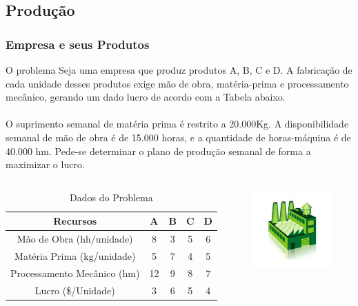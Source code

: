 \documentclass{beamer}
\begin{document}
\subsection{Produção}
\begin{frame}
	\frametitle{Empresa e seus Produtos}
	\begin{block}{O problema}
		\scriptsize
		Seja uma empresa que produz produtos A, B, C e D. A fabricação de cada unidade desses produtos exige mão de obra, matéria-prima e processamento mecânico, gerando um dado lucro de acordo com a Tabela abaixo.
		\\~\\
		O suprimento semanal de matéria prima é restrito a 20.000Kg. A disponibilidade semanal de mão de obra é de 15.000 horas, e a quantidade de horas-máquina é de 40.000 hm. Pede-se determinar o plano de produção semanal de forma a maximizar o lucro. 
	\end{block}
	\begin{columns}
		\begin{column}{0.7\textwidth}
			\begin{table}
				\scriptsize
				\caption{Dados do Problema}
				\begin{tabular}{| c | c | c | c | c |}
					\hline
					\textbf{Recursos} 			& \textbf{A} & \textbf{B} & \textbf{C} & \textbf{D} \\
					\hline
					Mão de Obra (hh/unidade)	& 8		     & 3		  & 5		   &6		    \\
					Matéria Prima (kg/unidade)	& 5			 & 7 		  & 4		   &5			\\
					Processamento Mecânico (hm) & 12		 & 9		  & 8  		   &7			\\
					Lucro (\$/Unidade)			& 3			 & 6		  & 5		   &4			\\
					\hline
				\end{tabular}
			\end{table}
		\end{column}
		\begin{column}{0.3\textwidth}
				\centering
				\includegraphics[width=3cm,height=3cm]{industria.jpg}
		\end{column}
	\end{columns}
\end{frame}
\end{document}
